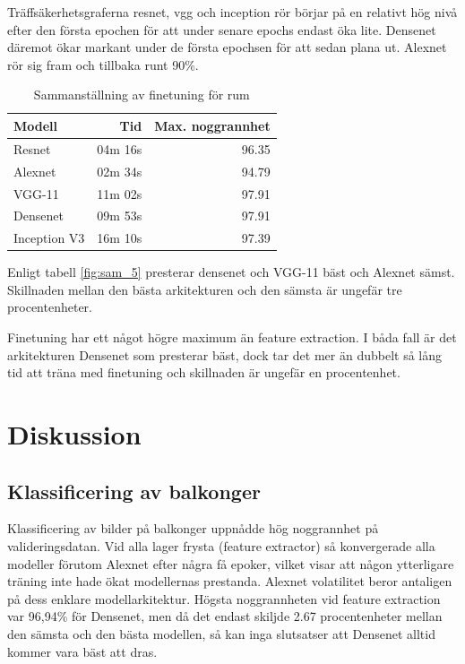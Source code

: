 \documentclass[]{kththesis}
\begin{document}
Träffsäkerhetsgraferna resnet, vgg och inception rör börjar på en relativt hög nivå efter den första epochen för att under senare epochs endast öka lite.
Densenet däremot ökar markant under de första epochsen för att sedan plana ut. 
Alexnet rör sig fram och tillbaka runt 90\%. 

\begin{table}[!htbp]
  \centering
  \begin{tabular}{|l|r|r|}
    Modell & Tid & Max. noggrannhet \\ 
    \hline
    Resnet       & 04m 16s & 96.35 \\
    Alexnet      & 02m 34s & 94.79 \\
    VGG-11       & 11m 02s & 97.91 \\
    Densenet     & 09m 53s & 97.91 \\
    Inception V3 & 16m 10s & 97.39 \\
  \end{tabular}
  \caption{Sammanställning av finetuning för rum}
  \label{fig:sam_6}    
\end{table}

Enligt tabell \ref{fig:sam_5} presterar densenet och VGG-11 bäst och Alexnet sämst.
Skillnaden mellan den bästa arkitekturen och den sämsta är ungefär tre procentenheter.

Finetuning har ett något högre maximum än feature extraction.
I båda fall är det arkitekturen Densenet som presterar bäst, dock tar det mer än dubbelt så lång tid att träna med finetuning och skillnaden är ungefär en procentenhet.


\chapter{Diskussion}

\section{Klassificering av balkonger}
Klassificering av bilder på balkonger uppnådde hög noggrannhet på valideringsdatan. Vid alla lager frysta (feature extractor) så konvergerade alla modeller förutom Alexnet efter några få epoker, vilket visar att någon ytterligare träning inte hade ökat modellernas prestanda. Alexnet volatilitet beror antaligen på dess enklare modellarkitektur. Högsta noggrannheten vid feature extraction var 96,94\% för Densenet, men då det endast skiljde 2.67 procentenheter mellan den sämsta och den bästa modellen, så kan inga slutsatser att Densenet alltid kommer vara bäst att dras.
\end{document}
